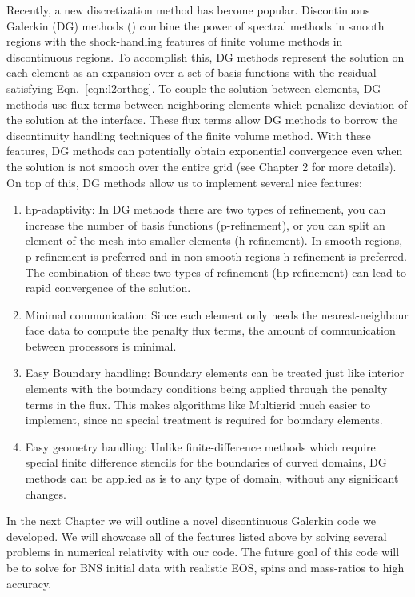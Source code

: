 Recently, a new discretization method has become popular. Discontinuous Galerkin (DG) methods (\cite{Reed.W;Hill.T1973,hesthaven2008nodal, Cock01,cockburn1998runge,Cockburn.B1998,Cockburn.B;Karniadakis.G;Shu.C2000}) combine the power of spectral methods in smooth regions with the shock-handling features of finite volume methods in discontinuous regions. To accomplish this, DG methods represent the solution on each element as an expansion over a set of basis functions with the residual satisfying Eqn.~\ref{eqn:l2orthog}. To couple the solution between elements, DG methods use flux terms between neighboring elements which penalize deviation of the solution at the interface. These flux terms allow DG methods to borrow the discontinuity handling techniques of the finite volume method. With these features, DG methods can potentially obtain exponential convergence even when the solution is not smooth over the entire grid (see Chapter 2 for more details). On top of this, DG methods allow us to implement several nice features:

\begin{enumerate}
\item hp-adaptivity: In DG methods there are two types of refinement, you can increase the number of basis functions (p-refinement), or you can split an element of the mesh into smaller elements (h-refinement). In smooth regions, p-refinement is preferred and in non-smooth regions h-refinement is preferred. The combination of these two types of refinement (hp-refinement) can lead to rapid convergence of the solution.
\item Minimal communication: Since each element only needs the nearest-neighbour face data to compute the penalty flux terms, the amount of communication between processors is minimal.
\item Easy Boundary handling: Boundary elements can be treated just like interior elements with the boundary conditions being applied through the penalty terms in the flux. This makes algorithms like Multigrid much easier to implement, since no special treatment is required for boundary elements.
\item Easy geometry handling: Unlike finite-difference methods which require special finite difference stencils for the boundaries of curved domains, DG methods can be applied as is to any type of domain, without any significant changes.
\end{enumerate}

In the next Chapter we will outline a novel discontinuous Galerkin code we developed. We will showcase all of the features listed above by solving several problems in numerical relativity with our code. The future goal of this code will be to solve for BNS initial data with realistic EOS, spins and mass-ratios to high accuracy.

